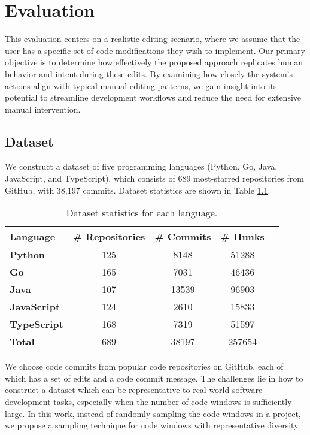 \chapter{Evaluation}

This evaluation centers on a realistic editing scenario, where we assume that the user has a specific set of code modifications they wish to implement. Our primary objective is to determine how effectively the proposed approach replicates human behavior and intent during these edits. By examining how closely the system’s actions align with typical manual editing patterns, we gain insight into its potential to streamline development workflows and reduce the need for extensive manual intervention.

\section{Dataset}

We construct a dataset of five programming languages (Python, Go, Java, JavaScript, and TypeScript), which consists of 689 most-starred repositories from GitHub,
with 38,197 commits. Dataset statistics are shown in Table \ref{tab:dataset-stats}.

\begin{table}[htbp]
\centering
\begin{tabular}{lcccc}
\hline
\textbf{Language} 
  & \textbf{\# Repositories} 
  & \textbf{\# Commits} 
  & \textbf{\# Hunks} \\
\hline
\textbf{Python}      
  & 125   & 8148  
  & 51288 \\

\textbf{Go}          
  & 165   & 7031    
  & 46436 \\

\textbf{Java}        
  & 107   & 13539 
  & 96903 \\

\textbf{JavaScript}  
  & 124   & 2610      
  & 15833 \\

\textbf{TypeScript}  
  & 168  & 7319     
  & 51597\\
\hline
\textbf{Total}       
  & 689 & 38197
  & 257654 \\
\hline
\end{tabular}
\caption{Dataset statistics for each language.}
\label{tab:dataset-stats}
\end{table}

We choose code commits from popular code repositories on GitHub, each of which has a set of edits and a code commit message. The challenges lie in how to construct a dataset which can be representative to real-world software development tasks,  especially when the number of code windows is sufficiently large. In this work, instead of randomly sampling the code windows in a project, we propose a sampling technique for code windows with representative diversity.

